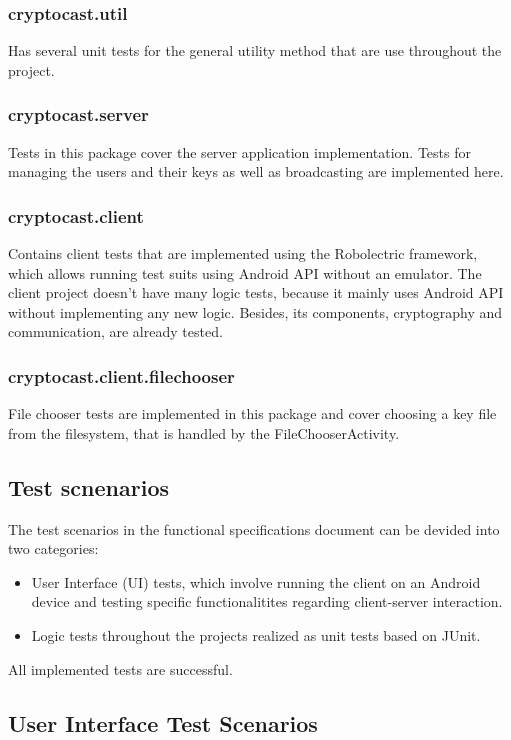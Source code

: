 \documentclass[a4paper,10pt]{scrartcl}
\begin{document}
\subsubsection{cryptocast.util}
Has several unit tests for the general utility method that are use throughout the project.
\subsubsection{cryptocast.server}
Tests in this package cover the server application implementation. Tests for managing the users and their keys as well as broadcasting are implemented here.
\subsubsection{cryptocast.client}
Contains client tests that are implemented using the Robolectric framework, which allows running test suits using Android API without an emulator. The client project doesn't have many logic tests, because it mainly uses Android API without implementing any new logic. Besides, its components, cryptography and communication, are already tested.
\subsubsection{cryptocast.client.filechooser}
File chooser tests are implemented in this package and cover choosing a key file from the filesystem, that is handled by the FileChooserActivity.

\subsection{Test scnenarios}
The test scenarios in the functional specifications document can be devided into two categories:

\begin{itemize}
	\item User Interface (UI) tests, which involve running the client on an Android device and testing specific functionalitites regarding client-server interaction.
	\item Logic tests throughout the projects realized as unit tests based on JUnit. 
\end{itemize}
All implemented tests are successful.
\subsection{User Interface Test Scenarios}
\end{document}
